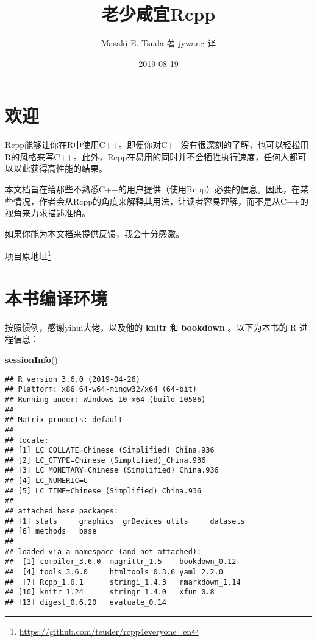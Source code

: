 \documentclass[]{ctexbook}
\title{老少咸宜Rcpp}
\author{Masaki E. Tsuda 著 jywang 译}
\date{2019-08-19}
\newenvironment{Shaded}{\begin{snugshade}}{\end{snugshade}}
\newcommand{\KeywordTok}[1]{\textcolor[rgb]{0.13,0.29,0.53}{\textbf{#1}}}
\newcommand{\NormalTok}[1]{#1}
\renewcommand{\href}[2]{#2\footnote{\url{#1}}}
\begin{document}
\maketitle


\thispagestyle{empty}

\setlength{\abovedisplayskip}{-5pt}
\setlength{\abovedisplayshortskip}{-5pt}

{
\setcounter{tocdepth}{2}
\tableofcontents
}
\listoftables
\listoffigures
\chapter*{欢迎}


Rcpp能够让你在R中使用C++。即便你对C++没有很深刻的了解，也可以轻松用R的风格来写C++。此外，Rcpp在易用的同时并不会牺牲执行速度，任何人都可以以此获得高性能的结果。

本文档旨在给那些不熟悉C++的用户提供（使用Rcpp）必要的信息。因此，在某些情况，作者会从Rcpp的角度来解释其用法，让读者容易理解，而不是从C++的视角来力求描述准确。

如果你能为本文档来提供反馈，我会十分感激。

\href{https://github.com/teuder/rcpp4everyone_en}{项目原地址}

\chapter*{本书编译环境}


按照惯例，感谢yihui大佬，以及他的 \textbf{knitr}
\citep{xie2015} 和 \textbf{bookdown}
\citep{R-bookdown}。以下为本书的 R 进程信息：

\begin{Shaded}
\begin{Highlighting}[]
\KeywordTok{sessionInfo}\NormalTok{()}
\end{Highlighting}
\end{Shaded}

\begin{verbatim}
## R version 3.6.0 (2019-04-26)
## Platform: x86_64-w64-mingw32/x64 (64-bit)
## Running under: Windows 10 x64 (build 10586)
## 
## Matrix products: default
## 
## locale:
## [1] LC_COLLATE=Chinese (Simplified)_China.936 
## [2] LC_CTYPE=Chinese (Simplified)_China.936   
## [3] LC_MONETARY=Chinese (Simplified)_China.936
## [4] LC_NUMERIC=C                              
## [5] LC_TIME=Chinese (Simplified)_China.936    
## 
## attached base packages:
## [1] stats     graphics  grDevices utils     datasets 
## [6] methods   base     
## 
## loaded via a namespace (and not attached):
##  [1] compiler_3.6.0  magrittr_1.5    bookdown_0.12  
##  [4] tools_3.6.0     htmltools_0.3.6 yaml_2.2.0     
##  [7] Rcpp_1.0.1      stringi_1.4.3   rmarkdown_1.14 
## [10] knitr_1.24      stringr_1.4.0   xfun_0.8       
## [13] digest_0.6.20   evaluate_0.14
\end{verbatim}
\end{document}
